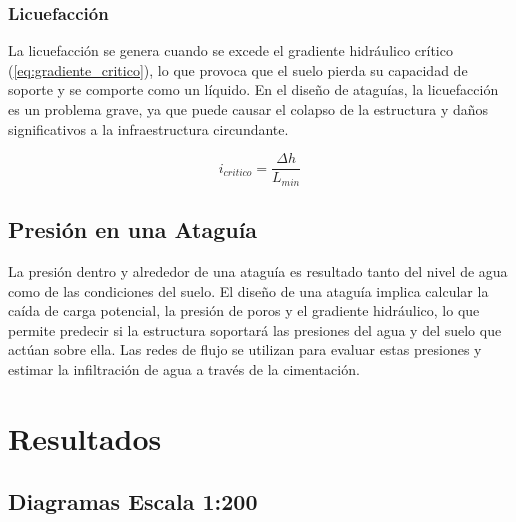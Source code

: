 \subsubsection{Licuefacción}
La licuefacción se genera cuando se excede el gradiente hidráulico crítico (\ref{eq:gradiente_critico}), lo que provoca que el suelo pierda su capacidad de soporte y se comporte como un líquido. En el diseño de ataguías, la licuefacción es un problema grave, ya que puede causar el colapso de la estructura y daños significativos a la infraestructura circundante. \cite{budhu_soil_2010}

\begin{equation}
    i_{critico} = \frac{\Delta h}{L_{min}}
    \label{eq:gradiente_critico}
\end{equation}

\subsection{Presión en una Ataguía}
La presión dentro y alrededor de una ataguía es resultado tanto del nivel de agua como de las condiciones del suelo. El diseño de una ataguía implica calcular la caída de carga potencial, la presión de poros y el gradiente hidráulico, lo que permite predecir si la estructura soportará las presiones del agua y del suelo que actúan sobre ella. Las redes de flujo se utilizan para evaluar estas presiones y estimar la infiltración de agua a través de la cimentación. \cite{sivakugan2005}

\section{Resultados}

\subsection{Diagramas Escala 1:200}

